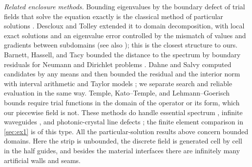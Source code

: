 \emph{Related enclosure methods.} Bounding eigenvalues by the boundary defect of
trial fields that solve the equation exactly is the classical method of
particular solutions \cite{MolerPayne1968,BetckeTrefethen2005}. Descloux and
Tolley extended it to domain decomposition, with local exact solutions and an
eigenvalue error controlled by the mismatch of values and gradients between
subdomains \cite{DesclouxTolley1983} (see also \cite[Lem.~2.1]{Betcke2007});
this is the closest structure to ours. Barnett, Hassell, and Tacy bounded the
distance to the spectrum by boundary residuals for Neumann and Dirichlet
problems \cite{BarnettHassell2011,BarnettHassellTacy2018}. Dahne and Salvy
computed candidates by any means and then bounded the residual and the interior
norm with interval arithmetic and Taylor models \cite{DahneSalvy2020}; we
separate search and reliable evaluation in the same way. Temple, Kato--Temple,
and Lehmann--Goerisch bounds \cite{Temple1928,NakaoPlumWatanabe2019} require
trial functions in the domain of the operator or its form, which our
piecewise field is not. These methods do handle essential spectrum
\cite{ZimmermannMertins1995,DaviesPlum2004}, infinite waveguides
\cite{BehnkeMertinsPlumWieners2000}, and photonic-crystal line defects
\cite{BrownHoangPlumWood2009,HoangPlumWieners2009}; the finite element comparison
in \cref{sec:ex1} is of this type. All the particular-solution results above
concern bounded domains. Here the strip is unbounded, the discrete field is
generated cell by cell in the half guides, and besides the material interfaces
there are infinitely many artificial walls and seams.

